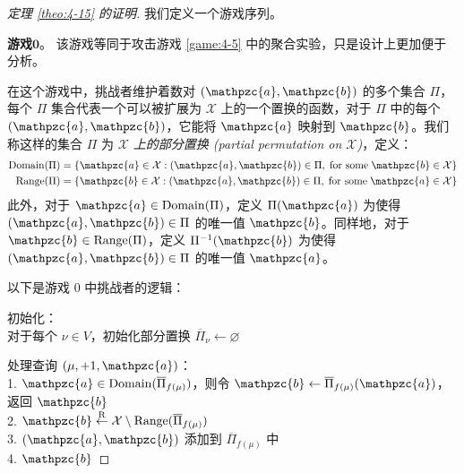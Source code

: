 \begin{proof}[定理 \ref{theo:4-15} 的证明]
我们定义一个游戏序列。

\vspace{5pt}

\noindent\textbf{游戏$\mathbf{0}$}。
该游戏等同于攻击游戏 \ref{game:4-5} 中的聚合实验，只是设计上更加便于分析。

在这个游戏中，挑战者维护着数对 $(\mathpzc{a},\mathpzc{b})$ 的多个集合 $\Pi$，每个 $\Pi$ 集合代表一个可以被扩展为 $\mathcal{X}$ 上的一个置换的函数，对于 $\Pi$ 中的每个 $(\mathpzc{a},\mathpzc{b})$，它能将 $\mathpzc{a}$ 映射到 $\mathpzc{b}$。我们称这样的集合 $\Pi$ 为 \emph{$\mathcal{X}$ 上的部分置换 (partial permutation on $\mathcal{X}$)}，定义：
\begin{align*}
	{\rm Domain}(\Pi)=\{\mathpzc{a}\in\mathcal{X}:(\mathpzc{a},\mathpzc{b})\in\Pi,\;\text{for some}\;\mathpzc{b}\in\mathcal{X}\}\\
	{\rm Range}(\Pi)=\{\mathpzc{b}\in\mathcal{X}:(\mathpzc{a},\mathpzc{b})\in\Pi,\;\text{for some}\;\mathpzc{a}\in\mathcal{X}\}
\end{align*}
此外，对于 $\mathpzc{a}\in{\rm Domain}(\Pi)$，定义 $\Pi(\mathpzc{a})$ 为使得 $(\mathpzc{a},\mathpzc{b})\in\Pi$ 的唯一值 $\mathpzc{b}$。同样地，对于 $\mathpzc{b}\in{\rm Range}(\Pi)$，定义 $\Pi^{-1}(\mathpzc{b})$ 为使得 $(\mathpzc{a},\mathpzc{b})\in\Pi$ 的唯一值 $\mathpzc{a}$。

以下是游戏 $0$ 中挑战者的逻辑：

\vspace{5pt}

\hspace*{5pt} 初始化：\\
\hspace*{50pt} 对于每个 $\nu\in V$，初始化部分置换 $\overline\Pi_\nu\leftarrow\varnothing$

\vspace{5pt}

\hspace*{5pt} 处理查询 $(\mu,+1,\mathpzc{a})$：\\
\hspace*{26pt} 1.\quad\; $\mathpzc{a}\in{\rm Domain}(\overline\Pi_{f(\mu)})$，则令 $\mathpzc{b}\leftarrow\overline\Pi_{f(\mu)}(\mathpzc{a})$，返回 $\mathpzc{b}$\\
\hspace*{26pt} 2.\quad\; $\mathpzc{b}\overset{\rm R}\leftarrow\mathcal{X}\setminus{\rm Range}(\overline\Pi_{f(\mu)})$\\
\hspace*{26pt} 3.\quad\; $(\mathpzc{a},\mathpzc{b})$ 添加到 $\overline\Pi_{f(\mu)}$ 中\\
\hspace*{26pt} 4.\quad\; $\mathpzc{b}$


\end{proof}
